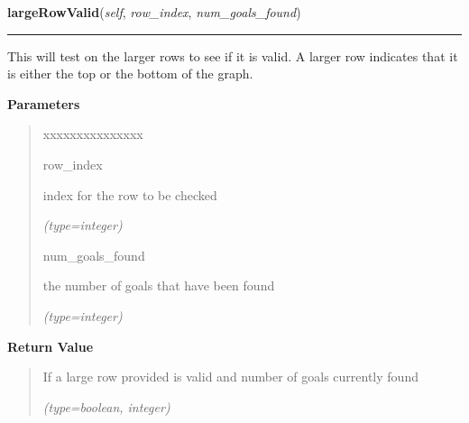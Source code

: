     \label{UnBlockMe:Map:Map:Map:largeRowValid}

    \vspace{0.5ex}

\hspace{.8\funcindent}\begin{boxedminipage}{\funcwidth}

    \raggedright \textbf{largeRowValid}(\textit{self}, \textit{row\_index}, \textit{num\_goals\_found})

    \vspace{-1.5ex}

    \rule{\textwidth}{0.5\fboxrule}
\setlength{\parskip}{2ex}
    This will test on the larger rows to see if it is valid. A larger row 
    indicates that it is either the top or the bottom of the graph.

\setlength{\parskip}{1ex}
      \textbf{Parameters}
      \vspace{-1ex}

      \begin{quote}
        \begin{Ventry}{xxxxxxxxxxxxxxx}

          \item[row\_index]

          index for the row to be checked

            {\it (type=integer)}

          \item[num\_goals\_found]

          the number of goals that have been found

            {\it (type=integer)}

        \end{Ventry}

      \end{quote}

      \textbf{Return Value}
    \vspace{-1ex}

      \begin{quote}
      If a large row provided is valid and number of goals currently found

      {\it (type=boolean, integer)}

      \end{quote}

    \end{boxedminipage}

